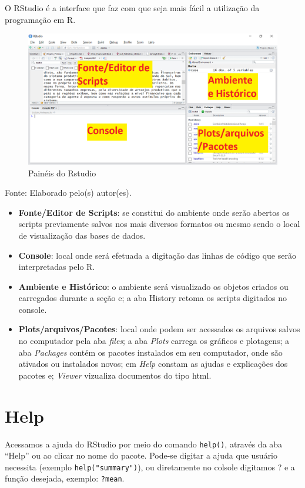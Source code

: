 \documentclass[12pt,brazil,]{book}
\providecommand{\tightlist}{%
  \setlength{\itemsep}{0pt}\setlength{\parskip}{0pt}}
\begin{document}
O RStudio é a interface que faz com que seja mais fácil a utilização da
programação em R.

\begin{figure}

{\centering \includegraphics[width=0.6\linewidth]{paineis} 

}

\caption{Painéis do Rstudio}\label{fig:paineis1}
\end{figure}

Fonte: Elaborado pelo(s) autor(es).

\begin{itemize}
\tightlist
\item
  \textbf{Fonte/Editor de Scripts}: se constitui do ambiente onde serão
  abertos os scripts previamente salvos nos mais diversos formatos ou
  mesmo sendo o local de visualização das bases de dados.
\item
  \textbf{Console}: local onde será efetuada a digitação das linhas de
  código que serão interpretadas pelo R.
\item
  \textbf{Ambiente e Histórico}: o ambiente será visualizado os objetos
  criados ou carregados durante a seção e; a aba History retoma os
  scripts digitados no console.
\item
  \textbf{Plots/arquivos/Pacotes}: local onde podem ser acessados os
  arquivos salvos no computador pela aba \emph{files}; a aba
  \emph{Plots} carrega os gráficos e plotagens; a aba \emph{Packages}
  contém os pacotes instalados em seu computador, onde são ativados ou
  instalados novos; em \emph{Help} constam as ajudas e explicações dos
  pacotes e; \emph{Viewer} vizualiza documentos do tipo html.
\end{itemize}

\hypertarget{help}{%
\section{Help}\label{help}}

Acessamos a ajuda do RStudio por meio do comando \texttt{help()},
através da aba ``Help'' ou ao clicar no nome do pacote. Pode-se digitar
a ajuda que usuário necessita (exemplo \texttt{help("summary")}), ou
diretamente no colsole digitamos ? e a função desejada, exemplo:
\texttt{?mean}.
\end{document}
